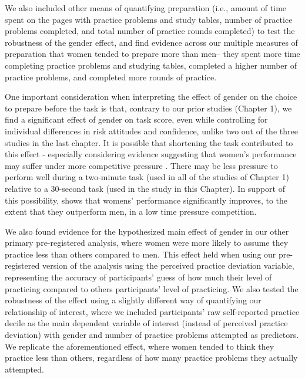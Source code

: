 \documentclass[a4paper, nobind]{templates/ociamthesis}
\begin{document}
We also included other means of quantifying preparation (i.e., amount of time spent on the pages with practice problems and study tables, number of practice problems completed, and total number of practice rounds completed) to test the robustness of the gender effect, and find evidence across our multiple measures of preparation that women tended to prepare more than men-- they spent more time completing practice problems and studying tables, completed a higher number of practice problems, and completed more rounds of practice.

One important consideration when interpreting the effect of gender on the choice to prepare before the task is that, contrary to our prior studies (Chapter 1), we find a significant effect of gender on task score, even while controlling for individual differences in risk attitudes and confidence, unlike two out of the three studies in the last chapter. It is possible that shortening the task contributed to this effect - especially considering evidence suggesting that women's performance may suffer under more competitive pressure \autocite{Gneezy2003,Gneezy2004,Gunther2010,Samak2013,Booth2022,Gneezy2004,Niederle2011,Cotton2013}. There may be less pressure to perform well during a two-minute task (used in all of the studies of Chapter 1) relative to a 30-second task (used in the study in this Chapter). In support of this possibility, \textcite{Shurchkov2012} shows that womens' performance significantly improves, to the extent that they outperform men, in a low time pressure competition.

We also found evidence for the hypothesized main effect of gender in our other primary pre-registered analysis, where women were more likely to assume they practice less than others compared to men. This effect held when using our pre-registered version of the analysis using the perceived practice deviation variable, representing the accuracy of participants' guess of how much their level of practicing compared to others participants' level of practicing. We also tested the robustness of the effect using a slightly different way of quantifying our relationship of interest, where we included participants' raw self-reported practice decile as the main dependent variable of interest (instead of perceived practice deviation) with gender and number of practice problems attempted as predictors. We replicate the aforementioned effect, where women tended to think they practice less than others, regardless of how many practice problems they actually attempted.
\end{document}
